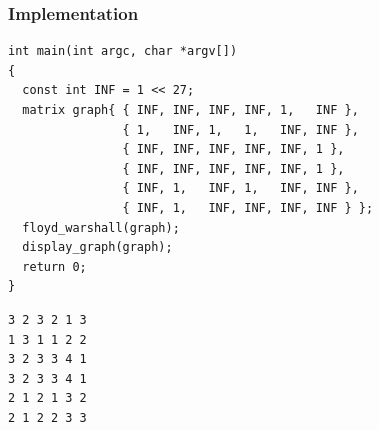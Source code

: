 \documentclass{beamer}
\newcounter{exo}
\newcommand{\exo}{
  \addtocounter{exo}{1}
  Exercice \arabic{exo}
}
\begin{document}
\begin{frame}[containsverbatim]
\frametitle{Implementation}

\scriptsize
\begin{lstlisting}
int main(int argc, char *argv[])
{
  const int INF = 1 << 27;
  matrix graph{ { INF, INF, INF, INF, 1,   INF },
                { 1,   INF, 1,   1,   INF, INF },
                { INF, INF, INF, INF, INF, 1 },
                { INF, INF, INF, INF, INF, 1 },
                { INF, 1,   INF, 1,   INF, INF },
                { INF, 1,   INF, INF, INF, INF } };
  floyd_warshall(graph);
  display_graph(graph);
  return 0;
}
\end{lstlisting}

\begin{verbatim}
3 2 3 2 1 3
1 3 1 1 2 2
3 2 3 3 4 1
3 2 3 3 4 1
2 1 2 1 3 2
2 1 2 2 3 3
\end{verbatim}

\end{frame}


\ifanswers
\end{document}
